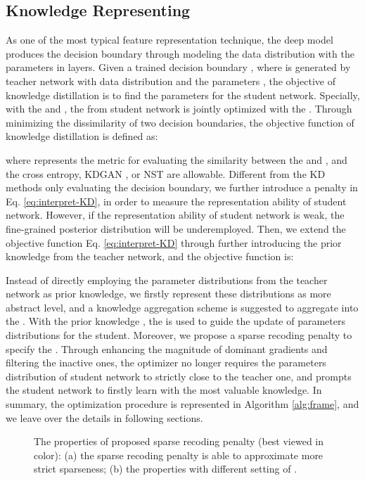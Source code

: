 \documentclass[10pt,twocolumn,letterpaper]{article}
\begin{document}
\subsection{Knowledge Representing} \label{3dot1}
As one of the most typical feature representation technique,
the deep model produces the decision boundary through
modeling the data distribution with the parameters in layers.
Given a trained decision boundary ,
where  is generated by teacher network with
data distribution  and the parameters ,
the objective of knowledge distillation is
to find the parameters  for the student network.
Specially,
with the  and ,
the  from student network
is jointly optimized with the .
Through minimizing the dissimilarity of two decision boundaries,
the objective function of knowledge distillation is defined as:



where  represents the metric for evaluating
the similarity between the  and ,
and the cross entropy, KDGAN \cite{wang2018kdgan}, or NST \cite{huang2017like} are allowable.
Different from the KD methods only evaluating the decision boundary,
we further introduce a penalty  in Eq. \ref{eq:interpret-KD},
in order to measure the representation ability of student network.
However,
if the representation ability of student network is weak,
the fine-grained posterior distribution will be underemployed.
Then,
we extend the objective function Eq. \ref{eq:interpret-KD}
through further introducing the prior knowledge  from the teacher network,
and the objective function is:



Instead of directly employing the parameter distributions 
from the teacher network as prior knowledge,
we firstly represent these distributions as more abstract level,
and a knowledge aggregation scheme  is suggested
to aggregate  into the .
With the prior knowledge ,
the  is used to guide the
update of parameters distributions  for the student.
Moreover,
we propose a sparse recoding penalty to specify the .
Through enhancing the magnitude of dominant gradients and filtering the inactive ones,
the optimizer no longer requires the parameters distribution  of student network
to strictly close to the teacher one,
and prompts the student network to firstly learn with the most valuable knowledge.
In summary,
the optimization procedure is represented in Algorithm \ref{alg:frame},
and we leave over the details in following sections.

\begin{figure}[t]
  \centering
  \caption{The properties of proposed sparse recoding penalty (best viewed in color):
  (a) the sparse recoding penalty is able to approximate more strict sparseness;
  (b) the properties with different setting of .}
  \label{fig:sp-loss}
\end{figure}
\end{document}
